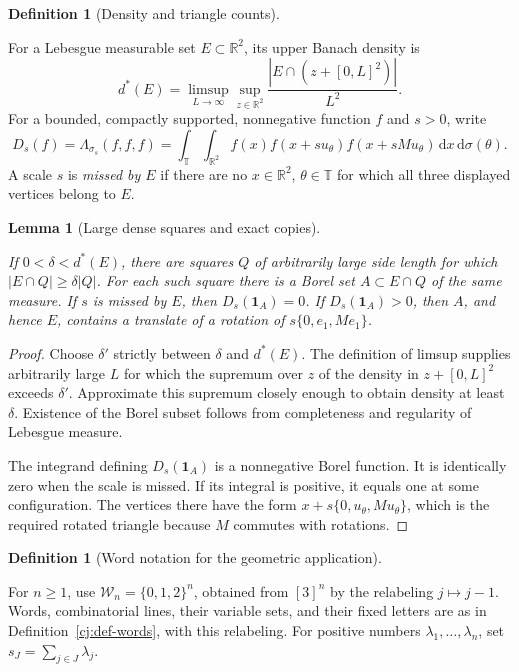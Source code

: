 \documentclass[11pt]{amsart}
\newcommand{\R}{\mathbb R}
\newcommand{\dd}{\,\mathrm d}
\newcommand{\one}{\mathbf 1}
\newtheorem{lemma}[theorem]{Lemma}
\theoremstyle{definition}
\newtheorem{definition}[theorem]{Definition}
\theoremstyle{remark}
\numberwithin{equation}{section}
\providecommand{\lean}[1]{}
\providecommand{\leanok}{}
\begin{document}
\begin{definition}[Density and triangle counts]\label{den:definitions}
\lean{Auto.squareAt,Auto.upperBanachDensity,Auto.triangleCount,Auto.IsMissed}
For a Lebesgue measurable set $E\subset\R^2$, its upper Banach
density is
\[
 d^*(E)=\limsup_{L\to\infty}\sup_{z\in\R^2}
           \frac{|E\cap(z+[0,L]^2)|}{L^2}.
\]
For a bounded, compactly supported, nonnegative function $f$ and
$s>0$, write
\[
 D_s(f)=\Lambda_{\sigma_s}(f,f,f)
       =\int_{\mathbb T}\int_{\R^2}
          f(x)f(x+su_\theta)f(x+sMu_\theta)
                                \dd x\dd\sigma(\theta).
\]
A scale $s$ is \emph{missed by $E$} if there are no
$x\in\R^2$, $\theta\in\mathbb T$ for which all three displayed
vertices belong to $E$.
\end{definition}

\begin{lemma}[Large dense squares and exact copies]\label{den:dense-squares}
\lean{Auto.den_dense_squares_exists,Auto.den_dense_squares_borel,Auto.den_dense_squares_missed,Auto.den_dense_squares_copy}
\leanok
If $0<\delta<d^*(E)$, there are squares $Q$ of arbitrarily
large side length for which $|E\cap Q|\ge\delta|Q|$.
For each such square there is a Borel set $A\subset E\cap Q$
of the same measure.  If $s$ is missed by $E$, then
$D_s(\one_A)=0$.  If $D_s(\one_A)>0$, then $A$, and hence
$E$, contains a translate of a rotation of
$s\{0,e_1,Me_1\}$.
\end{lemma}
\begin{proof}
Choose $\delta'$ strictly between $\delta$ and $d^*(E)$.
The definition of limsup supplies arbitrarily large $L$ for
which the supremum over $z$ of the density in $z+[0,L]^2$
exceeds $\delta'$.  Approximate this supremum closely enough
to obtain density at least $\delta$.  Existence of the Borel
subset follows from completeness and regularity of Lebesgue
measure.

The integrand defining $D_s(\one_A)$ is a nonnegative Borel
function.  It is identically zero when the scale is missed.
If its integral is positive, it equals one at some
configuration.  The vertices there have the form
$x+s\{0,u_\theta,Mu_\theta\}$, which is the required rotated
triangle because $M$ commutes with rotations.
\end{proof}

\begin{definition}[Word notation for the geometric application]\label{den:lines}
\lean{Auto.lineVarSet,Auto.subsum}
For $n\ge1$, use $\mathcal W_n=\{0,1,2\}^n$, obtained from
$[3]^n$ by the relabeling $j\mapsto j-1$.  Words, combinatorial
lines, their variable sets, and their fixed letters are as in
Definition~\ref{cj:def-words}, with this relabeling.
For positive numbers $\lambda_1,\ldots,\lambda_n$, set
$s_J=\sum_{j\in J}\lambda_j$.
\end{definition}
\end{document}
